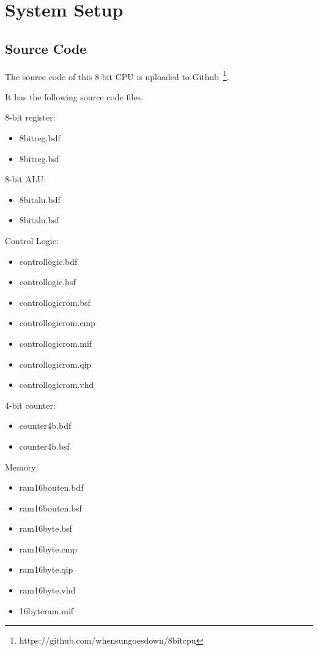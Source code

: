 \section{System Setup}
\label{sec:setup}

\subsection{Source Code}

The source code of this 8-bit CPU is uploaded to Github~\footnote{https://github.com/whensungoesdown/8bitcpu}.

It has the following source code files.

8-bit register:
\begin{itemize}
	\item 8bitreg.bdf
	\item 8bitreg.bsf
\end{itemize}

8-bit ALU:
\begin{itemize}
	\item 8bitalu.bdf
	\item 8bitalu.bsf
\end{itemize}

Control Logic:
\begin{itemize}
	\item controllogic.bdf
	\item controllogic.bsf
	\item controllogicrom.bsf
	\item controllogicrom.cmp
	\item controllogicrom.mif
	\item controllogicrom.qip
	\item controllogicrom.vhd
\end{itemize}

4-bit counter:
\begin{itemize}
	\item counter4b.bdf
	\item counter4b.bsf
\end{itemize}

Memory:
\begin{itemize}
	\item ram16bouten.bdf
	\item ram16bouten.bsf
	\item ram16byte.bsf
	\item ram16byte.cmp
	\item ram16byte.qip
	\item ram16byte.vhd
	\item 16byteram.mif
\end{itemize}

